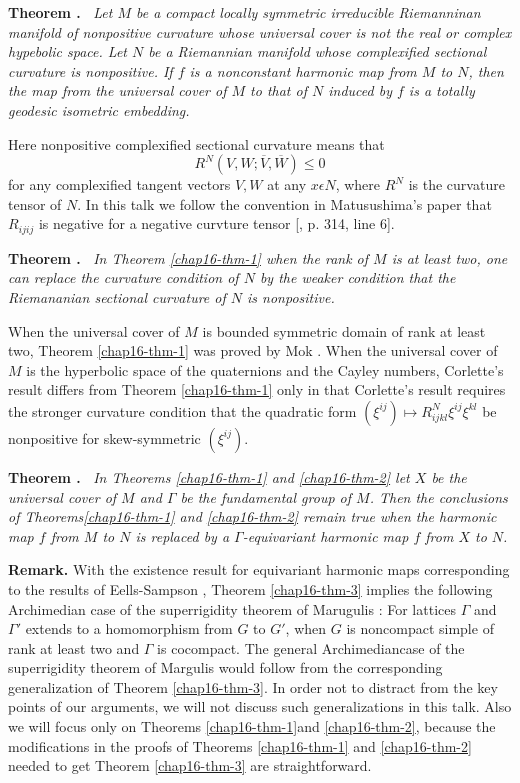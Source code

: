 \medskip
\noindent
{\bfseries Theorem . \label{chap16-thm-1}}~\textit{Let $M$ be a compact locally symmetric irreducible Riemanninan manifold of nonpositive curvature whose universal cover is not the real or complex hypebolic space. Let $N$ be a Riemannian manifold whose complexified sectional curvature is nonpositive. If $f$ is a nonconstant harmonic map from $M$ to $N$, then the map from the universal cover of $M$ to that of $N$ induced by $f$ is a totally geodesic isometric embedding.}

Here nonpositive complexified sectional curvature means that
$$
R^{N}(V, W; \overline{V}, \overline{W})\leq 0
$$
for any complexified tangent vectors $V, W$ at any $x \epsilon N$, where $R^{N}$ is the curvature tensor of $N$. In this talk we follow the convention in Matusushima's paper \cite{chap16-keyMat} that $R_{ijij}$ is negative for a negative curvture tensor [\cite{chap16-keyMat}, p. 314, line 6].

\medskip
\noindent
{\bfseries Theorem . \label{chap16-thm-2}}~\textit{In Theorem \ref{chap16-thm-1} when the rank of $M$ is at least two, one can replace the curvature condition of $N$ by the weaker condition that the Riemananian sectional curvature of $N$ is nonpositive.}

When the universal cover of $M$ is bounded symmetric domain of rank at least two, Theorem \ref{chap16-thm-1} was proved by Mok \cite{chap16-keyMo}. When the universal cover of $M$ is the hyperbolic space of the quaternions and the Cayley numbers, Corlette's result differs from Theorem \ref{chap16-thm-1} only in that Corlette's result requires the stronger curvature condition that the quadratic form $(\xi^{ij}) \mapsto R_{ijkl}^{N}\xi^{ij}\xi^{kl}$ be nonpositive for skew-symmetric $(\xi^{ij})$.

\medskip
\noindent
{\bfseries Theorem . \label{chap16-thm-3}}~\textit{In Theorems \ref{chap16-thm-1} and \ref{chap16-thm-2} let $X$ be the universal cover of $M$ and $\Gamma$ be the fundamental group of $M$. Then the conclusions of
Theorems\ref{chap16-thm-1} and \ref{chap16-thm-2} remain true when the harmonic map $f$ from $M$ to $N$ is replaced by a $\Gamma$-equivariant harmonic map $f$ from $X$ to $N$.}

\medskip
\noindent
{\bfseries Remark.} With the existence result for equivariant harmonic maps corresponding to the results of Eells-Sampson \cite{chap16-keyE-S}, Theorem \ref{chap16-thm-3} implies the following Archimedian case of the superrigidity theorem of Marugulis \cite{chap16-keyMar}: For lattices $\Gamma$ and $\Gamma'$ extends to a homomorphism from $G$ to $G'$, when $G$ is noncompact simple of rank at least two and $\Gamma$ is cocompact. The general Archimedian\pageoriginale case of the superrigidity theorem of Margulis would follow from the corresponding generalization of Theorem \ref{chap16-thm-3}. In order not to distract from the key points of our arguments, we will not discuss such generalizations in this talk. Also we will focus only on Theorems \ref{chap16-thm-1}and \ref{chap16-thm-2}, because the modifications in the proofs of Theorems
\ref{chap16-thm-1} and \ref{chap16-thm-2} needed to get Theorem \ref{chap16-thm-3} are straightforward. 

